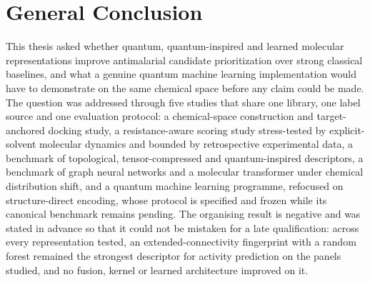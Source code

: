 \chapter*{General Conclusion}\label{chap:gen_con}

This thesis asked whether quantum, quantum-inspired and learned molecular representations improve antimalarial candidate prioritization over strong classical baselines, and what a genuine quantum machine learning implementation would have to demonstrate on the same chemical space before any claim could be made. The question was addressed through five studies that share one library, one label source and one evaluation protocol: a chemical-space construction and target-anchored docking study, a resistance-aware scoring study stress-tested by explicit-solvent molecular dynamics and bounded by retrospective experimental data, a benchmark of topological, tensor-compressed and quantum-inspired descriptors, a benchmark of graph neural networks and a molecular transformer under chemical distribution shift, and a quantum machine learning programme, refocused on structure-direct encoding, whose protocol is specified and frozen while its canonical benchmark remains pending. The organising result is negative and was stated in advance so that it could not be mistaken for a late qualification: across every representation tested, an extended-connectivity fingerprint with a random forest remained the strongest descriptor for activity prediction on the panels studied, and no fusion, kernel or learned architecture improved on it.

